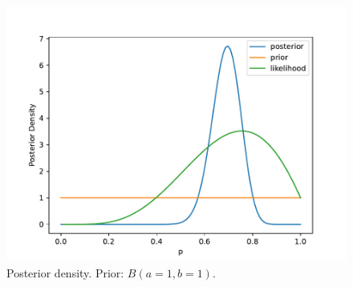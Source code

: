 \begin{figure}[H]
    \centering
    \includegraphics[width=0.8\linewidth]{images/bnb_posterior_density.pdf}
    \caption{Posterior density. Prior: $B(a=1, b=1)$.}
    \label{fig:posterior-density}
\end{figure}
    
\begin{center}
    
\end{center}
